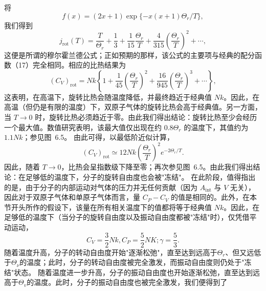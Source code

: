 将
\begin{equation}\tag{6.5.24}\label{eq:6.5.24}
f ( x ) = ( 2 x + 1 ) \exp \{ - x ( x + 1 ) \Theta _ { r } / T \} ,
\end{equation}
我们得到
\begin{equation}\tag{6.5.25}\label{eq:6.5.25}
j _ { \mathrm { r o t } } ( T ) = \frac { T } { \Theta _ { r } } + \frac { 1 } { 3 } + \frac { 1 } { 15 } \frac { \Theta _ { r } } { T } + \frac { 4 } { 31 5 } \left( \frac { \Theta _ { r } } { T } \right) ^{2} + \cdots ,
\end{equation}
这便是所谓的穆尔霍兰德公式；正如预期的那样，该公式的主要项与经典的配分函数（17）完全相同。相应的比热结果为
\begin{equation}\tag{6.5.26}\label{eq:6.5.26}
( C _ { V } ) _ { \mathrm { r o t } } = N k \left\{ 1 + \frac { 1 } { 45 } \left( \frac { \Theta _ { r } } { T } \right) ^{2} + \frac { 16 } { 94 5 } \left( \frac { \Theta _ { r } } { T } \right) ^{3} + \cdots \right\} ,
\end{equation}
这表明，在高温下，旋转比热会随温度降低，并最终趋近于经典值 \(Nk\)。因此，在高温（但仍是有限的温度）下，双原子气体的旋转比热会高于经典值。另一方面，当 \(T \to 0\) 时，旋转比热必须趋近于零。由此我们得出结论：旋转比热至少会经历一个最大值。数值研究表明，该最大值仅出现在约 \(0.8\Theta_r\) 的温度下，其值约为 \(1.1Nk\)；参见图~6.5。
由此可得，以最低阶近似计算，
\begin{equation}\tag{6.5.27}\label{eq:6.5.27}
( C _ { V } ) _ { \mathrm { r o t } } \simeq 12 N k \left( \frac { \Theta _ { r } } { T } \right) ^{2} e ^{- 2 \Theta _ { r} / T } .
\end{equation}
因此，随着 \(T \rightarrow 0\)，比热会呈指数级下降至零；再次参见图~6.5。由此我们得出结论：在足够低的温度下，分子的旋转自由度也会被"冻结"。
在此阶段，值得指出的是，由于分子的内部运动对气体的压力并无任何贡献（因为 \(A_{\mathrm{int}}\) 与 \(V\) 无关），因此对于双原子气体和单原子气体而言，量 \(C_{P}-C_{V}\) 的值是相同的。此外，在本节开头所作的假设下，该量在所有相关温度下的值都将等于经典值 \(Nk\)。因此，在足够低的温度下（当分子的旋转自由度以及振动自由度都被"冻结"时），仅凭借平动运动，
\begin{equation}\tag{6.5.28}\label{eq:6.5.28}
C _ { V } = \frac { 3 } { 2 } N k ,  C _ { P } = \frac { 5 } { 2 } N K ;  \gamma = \frac { 5 } { 3 } .
\end{equation}
随着温度升高，分子的转动自由度开始"逐渐松弛"，直至达到远高于\(\Theta_{r}\)、但又远低于\(\Theta_{\nu}\)的温度；此时，分子的转动自由度被完全激发，而振动自由度则仍处于"冻结"状态。
随着温度进一步升高，分子的振动自由度也开始逐渐松弛，直至达到远高于\(\Theta_{v}\)的温度。此时，分子的振动自由度也被完全激发，我们便得到了
